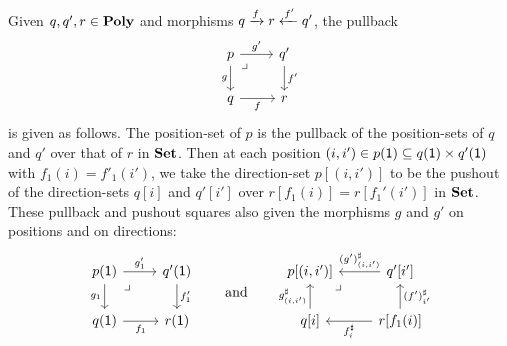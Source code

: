 \documentclass[Book-Poly]{subfiles}
\begin{document}
\begin{example}\label{ex.pullbacks_in_poly}
Given $q,q',r \in \mathbf{Poly}$ and morphisms $q\xrightarrow{f} r\xleftarrow{f'} q'$, the pullback 
\[
\begin{tikzcd}
	p\ar[r, "g'"]\ar[d, "g"']&
	q'\ar[d, "f'"]\\
	q\ar[r, "f"']&
	r\ar[ul, phantom, very near end, "\lrcorner"]
\end{tikzcd}
\]
 is given as follows.
 The position-set of $p$ is the pullback of the position-sets of $q$ and $q'$ over that of $r$ in $\mathbf{Set}$.
 Then at each position $(i, i') \in p(\textsf{1}) \subseteq q(\textsf{1}) \times q'(\textsf{1})$ with $f_1(i)=f'_1(i')$, we take the direction-set $p[(i, i')]$ to be the pushout of the direction-sets $q[i]$ and $q'[i']$ over $r[f_1(i)]=r[f_1'(i')]$ in $\mathbf{Set}$.
 These pullback and pushout squares also given the morphisms $g$ and $g'$ on positions and on directions:
\begin{equation}\label{eqn.pullback_poly}
\begin{tikzcd}
	p(\1)\ar[r, "g'_1"]\ar[d, "g_1"']&
	q'(\1)\ar[d, "f_1'"]\\
	q(\1)\ar[r, "f_1"']&
	r(\1)\ar[ul, phantom, very near end, "\lrcorner"]
\end{tikzcd}
\qqand
\begin{tikzcd}
	p[(i,i')]\ar[from=r, "(g')^\sharp_{(i,i')}"']\ar[from=d, "g^\sharp_{(i,i')}"]&
	q'[i']\ar[from=d, "(f')^\sharp_{i'}"']\\
	q[i]\ar[from=r, "f^\sharp_i"]&
	r[f_1(i)]\ar[ul, phantom, very near end, "\lrcorner"]
\end{tikzcd}
\end{equation}
\end{example}
\end{document}
